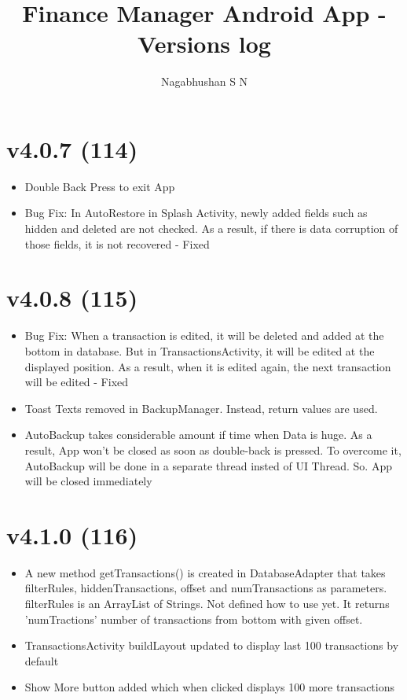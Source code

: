 \documentclass{article}
\title{Finance Manager Android App - Versions log}
\author{Nagabhushan S N}
\begin{document}
    \maketitle
    \tableofcontents
    \newpage

    \section{v4.0.7 (114)}\label{sec:114}
    \begin{itemize}
        \item Double Back Press to exit App
        \item Bug Fix: In AutoRestore in Splash Activity, newly added fields such as hidden and deleted are not checked.
        As a result, if there is data corruption of those fields, it is not recovered - Fixed
    \end{itemize}

    \section{v4.0.8 (115)}\label{sec:115}
    \begin{itemize}
        \item Bug Fix: When a transaction is edited, it will be deleted and added at the bottom in database.
        But in TransactionsActivity, it will be edited at the displayed position.
        As a result, when it is edited again, the next transaction will be edited - Fixed
        \item Toast Texts removed in BackupManager.
        Instead, return values are used.
        \item AutoBackup takes considerable amount if time when Data is huge.
        As a result, App won't be closed as soon as double-back is pressed.
        To overcome it, AutoBackup will be done in a separate thread insted of UI Thread.
        So. App will be closed immediately
    \end{itemize}

    \section{v4.1.0 (116)}\label{sec:116}
    \begin{itemize}
        \item A new method getTransactions() is created in DatabaseAdapter that takes filterRules, hiddenTransactions, offset and numTransactions as parameters.
        filterRules is an ArrayList of Strings.
        Not defined how to use yet.
        It returns 'numTractions' number of transactions from bottom with given offset.
        \item TransactionsActivity buildLayout updated to display last 100 transactions by default
        \item Show More button added which when clicked displays 100 more transactions
    \end{itemize}
\end{document}
